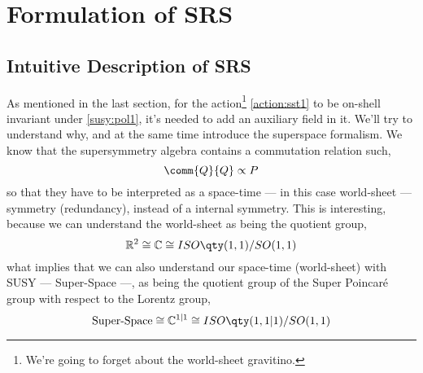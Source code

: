 \section{Formulation of SRS}
\label{sec:form}

\subsection{Intuitive Description of SRS}

As mentioned in the last section, for the action\footnote{We're going to forget about the 
world-sheet gravitino.} \eqref{action:sst1} to be on-shell invariant under \eqref{susy:pol1}, 
it's needed to add an auxiliary field in it. We'll try to understand why, and at the same time introduce the 
superspace formalism. We know that the supersymmetry algebra contains a commutation relation such,
$$\comm{Q}{Q}\propto P$$
so that they have to be interpreted as a space-time --- in this case world-sheet --- symmetry (redundancy), 
instead of a internal symmetry. This is interesting, because we can understand the world-sheet as being 
the quotient group, $$\mathbb R^2\cong\mathbb C\cong ISO\qty(1,1)/SO(1,1)$$ what implies that we 
can also understand our space-time (world-sheet) with SUSY --- Super-Space ---, as being the quotient group of the 
Super Poincaré group with respect to the Lorentz group, 
$$\textnormal{Super-Space}\cong\mathbb C^{1|1}\cong ISO\qty(1,1|1)/SO(1,1)$$

